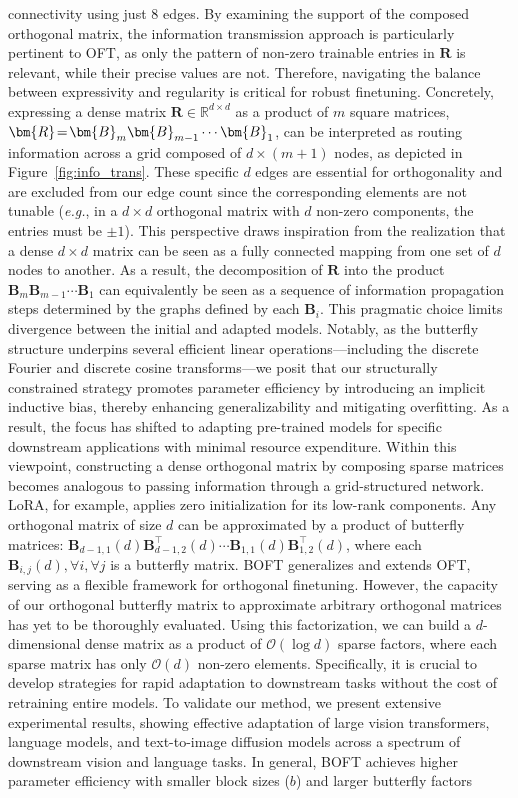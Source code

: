 \begin{itemize}[leftmargin=*,nosep]
connectivity using just $8$ edges. By examining the support of the composed orthogonal matrix, the information transmission approach is particularly pertinent to OFT, as only the pattern of non-zero trainable entries in $\bm{R}$ is relevant, while their precise values are not. Therefore, navigating the balance between expressivity and regularity is critical for robust finetuning. Concretely, expressing a dense matrix $\bm{R}\in\mathbb{R}^{d\times d}$ as a product of $m$ square matrices, $\thickmuskip=2mu \medmuskip=2mu \bm{R} = \bm{B}_m\bm{B}_{m-1}\cdots\bm{B}_1$, can be interpreted as routing information across a grid composed of $d\times (m+1)$ nodes, as depicted in Figure~\ref{fig:info_trans}. These specific $d$ edges are essential for orthogonality and are excluded from our edge count since the corresponding elements are not tunable (\emph{e.g.}, in a $d\times d$ orthogonal matrix with $d$ non-zero components, the entries must be $\pm 1$). This perspective draws inspiration from the realization that a dense $d \times d$ matrix can be seen as a fully connected mapping from one set of $d$ nodes to another. As a result, the decomposition of $\bm{R}$ into the product $\bm{B}_m\bm{B}_{m-1}\cdots\bm{B}_1$ can equivalently be seen as a sequence of information propagation steps determined by the graphs defined by each $\bm{B}_i$. This pragmatic choice limits divergence between the initial and adapted models. Notably, as the butterfly structure underpins several efficient linear operations—including the discrete Fourier and discrete cosine transforms—we posit that our structurally constrained strategy promotes parameter efficiency by introducing an implicit inductive bias, thereby enhancing generalizability and mitigating overfitting. As a result, the focus has shifted to adapting pre-trained models for specific downstream applications with minimal resource expenditure. Within this viewpoint, constructing a dense orthogonal matrix by composing sparse matrices becomes analogous to passing information through a grid-structured network. LoRA, for example, applies zero initialization for its low-rank components. Any orthogonal matrix of size $d$ can be approximated by a product of butterfly matrices: $\bm{B}_{d-1,1}(d)\bm{B}^\top_{d-1,2}(d)\cdots\bm{B}_{1,1}(d)\bm{B}^\top_{1,2}(d)$, where each $\bm{B}_{i,j}(d),\forall i,\forall j$ is a butterfly matrix. BOFT generalizes and extends OFT, serving as a flexible framework for orthogonal finetuning. However, the capacity of our orthogonal butterfly matrix to approximate arbitrary orthogonal matrices has yet to be thoroughly evaluated. Using this factorization, we can build a $d$-dimensional dense matrix as a product of $\mathcal{O}(\log d)$ sparse factors, where each sparse matrix has only $\mathcal{O}(d)$ non-zero elements. Specifically, it is crucial to develop strategies for rapid adaptation to downstream tasks without the cost of retraining entire models. To validate our method, we present extensive experimental results, showing effective adaptation of large vision transformers, language models, and text-to-image diffusion models across a spectrum of downstream vision and language tasks. In general, BOFT achieves higher parameter efficiency with smaller block sizes ($b$) and larger butterfly factors 
\end{itemize}
